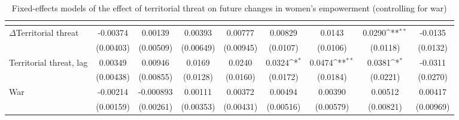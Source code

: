 \begin{table}[htbp]\centering
\def\sym#1{\ifmmode^{#1}\else\(^{#1}\)\fi}
\caption{Fixed-effects models of the effect of territorial threat on future changes in women's empowerment (controlling for war) \label{fepolempwar}}
\begin{tabular}{l*{8}{c}}
\hline\hline
                    &&&&&&&&\\
\hline
$\Delta$Territorial threat      &    -0.00374         &     0.00139         &     0.00393         &     0.00777         &     0.00829         &      0.0143         &      0.0290\sym{**} &     -0.0135         \\
                    &   (0.00403)         &   (0.00509)         &   (0.00649)         &   (0.00945)         &    (0.0107)         &    (0.0106)         &    (0.0118)         &    (0.0132)         \\
[1em]
Territorial threat, lag    &     0.00349         &     0.00946         &      0.0169         &      0.0240         &      0.0324\sym{*}  &      0.0474\sym{**} &      0.0381\sym{*}  &     -0.0311         \\
                    &   (0.00438)         &   (0.00855)         &    (0.0128)         &    (0.0160)         &    (0.0172)         &    (0.0184)         &    (0.0221)         &    (0.0270)         \\
[1em]
War                 &    -0.00214         &   -0.000893         &     0.00111         &     0.00372         &     0.00494         &     0.00390         &     0.00512         &     0.00417         \\
                    &   (0.00159)         &   (0.00261)         &   (0.00353)         &   (0.00431)         &   (0.00516)         &   (0.00579)         &   (0.00821)         &   (0.00969)         \\

\end{tabular}
\end{table}
